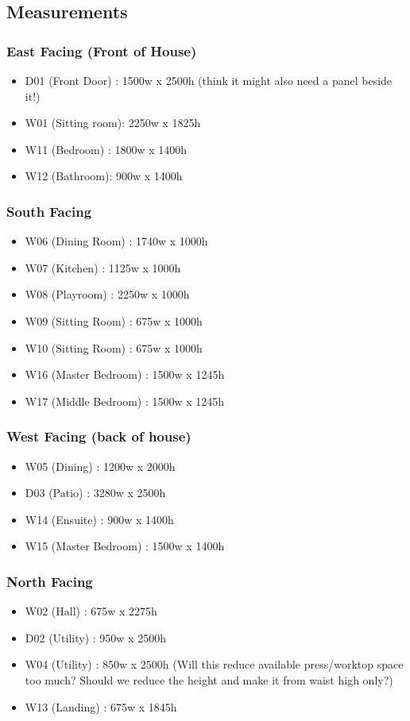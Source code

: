 \subsection{Measurements}
\subsubsection{East Facing (Front of House)}
\begin{itemize}
\item D01 (Front Door) : 1500w x 2500h (think it might also need a panel beside it!)
\item W01 (Sitting room): 2250w x 1825h
\item W11 (Bedroom) : 1800w x 1400h
\item W12 (Bathroom): 900w x 1400h
\end{itemize}    
    
\subsubsection{South Facing}
\begin{itemize}
\item W06 (Dining Room) : 1740w x 1000h
\item W07 (Kitchen) : 1125w x 1000h
\item W08 (Playroom) : 2250w x 1000h
\item W09 (Sitting Room) : 675w x 1000h
\item W10 (Sitting Room) : 675w x 1000h
\item W16 (Master Bedroom) : 1500w x 1245h
\item W17 (Middle Bedroom) : 1500w x 1245h
\end{itemize}

\subsubsection{West Facing (back of house)}
\begin{itemize}
\item W05 (Dining) : 1200w x 2000h
\item D03 (Patio) : 3280w x 2500h
\item W14 (Ensuite) : 900w x 1400h
\item W15 (Master Bedroom) : 1500w x 1400h    
\end{itemize}

\subsubsection{North Facing}
\begin{itemize}
\item W02 (Hall) : 675w x 2275h
\item D02 (Utility) : 950w x 2500h
\item W04 (Utility) : 850w x 2500h (Will this reduce available press/worktop space too much? 
        Should we reduce the height and make it from waist high only?)
\item W13 (Landing) : 675w x 1845h
\end{itemize}

